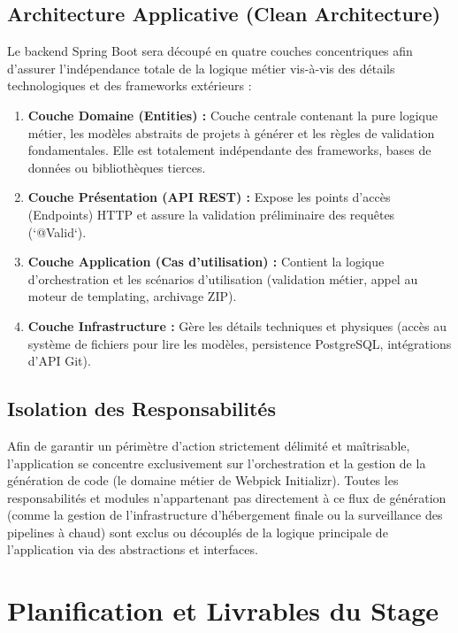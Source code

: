\documentclass[12pt,a4paper]{article}
\begin{document}
\subsection{Architecture Applicative (Clean Architecture)}
Le backend Spring Boot sera découpé en quatre couches concentriques afin d'assurer l'indépendance totale de la logique métier vis-à-vis des détails technologiques et des frameworks extérieurs :
\begin{enumerate}
    \item \textbf{Couche Domaine (Entities) :} Couche centrale contenant la pure logique métier, les modèles abstraits de projets à générer et les règles de validation fondamentales. Elle est totalement indépendante des frameworks, bases de données ou bibliothèques tierces.
    \item \textbf{Couche Présentation (API REST) :} Expose les points d'accès (Endpoints) HTTP et assure la validation préliminaire des requêtes (`@Valid`).
    \item \textbf{Couche Application (Cas d'utilisation) :} Contient la logique d'orchestration et les scénarios d'utilisation (validation métier, appel au moteur de templating, archivage ZIP).
    \item \textbf{Couche Infrastructure :} Gère les détails techniques et physiques (accès au système de fichiers pour lire les modèles, persistence PostgreSQL, intégrations d'API Git).
\end{enumerate}

\subsection{Isolation des Responsabilités}
Afin de garantir un périmètre d'action strictement délimité et maîtrisable, l'application se concentre exclusivement sur l'orchestration et la gestion de la génération de code (le domaine métier de Webpick Initializr). Toutes les responsabilités et modules n'appartenant pas directement à ce flux de génération (comme la gestion de l'infrastructure d'hébergement finale ou la surveillance des pipelines à chaud) sont exclus ou découplés de la logique principale de l'application via des abstractions et interfaces.

\section{Planification et Livrables du Stage}
\end{document}
